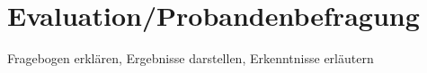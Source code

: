 \section{Evaluation/Probandenbefragung} \label{Evaluation}
Fragebogen erklären, Ergebnisse darstellen, Erkenntnisse erläutern
